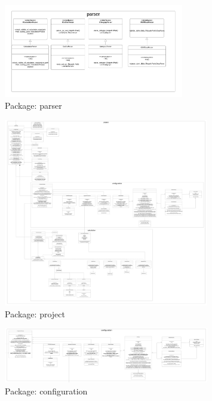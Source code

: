 \documentclass[parskip=full]{scrartcl} %
\begin{document}
\hypertarget{parser}{
\begin{figure}[hbt!]
  \centering
\includegraphics[width=0.7\textwidth]
        {pictures/parser.png}
  \caption{Package: parser}
  \label{fig:mvc}
\end{figure}
}

\hypertarget{project}{
\begin{figure}[hbt!]
  \centering
\includegraphics[width=0.8\textwidth]
        {pictures/project.png}
  \caption{Package: project}
  \label{fig:mvc}
\end{figure}
}

\hypertarget{configuration}{
\begin{figure}[hbt!]
  \centering
\includegraphics[width=0.8\textwidth]
        {pictures/configuration.png}
  \caption{Package: configuration}
  \label{fig:mvc}
\end{figure}
}
\end{document}
